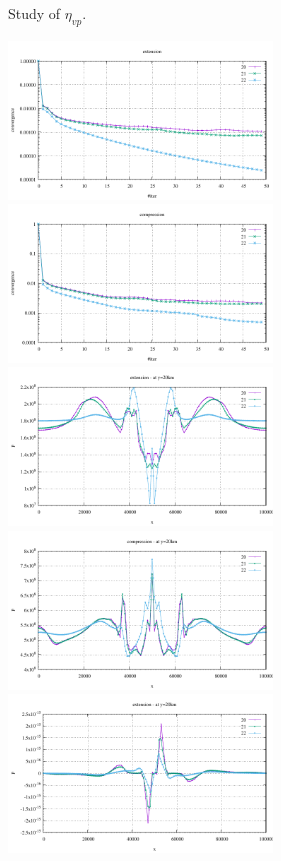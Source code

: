 \newpage
Study of $\eta_{vp}$. 

\begin{center}
\includegraphics[width=7cm]{python_codes/fieldstone_70/results_vpstudy/conv_extension.pdf}
\includegraphics[width=7cm]{python_codes/fieldstone_70/results_vpstudy/conv_compression.pdf}\\
\includegraphics[width=7cm]{python_codes/fieldstone_70/results_vpstudy/pressure_extension.pdf}
\includegraphics[width=7cm]{python_codes/fieldstone_70/results_vpstudy/pressure_compression.pdf}\\
\includegraphics[width=7cm]{python_codes/fieldstone_70/results_vpstudy/exy_extension.pdf}

\end{center}
